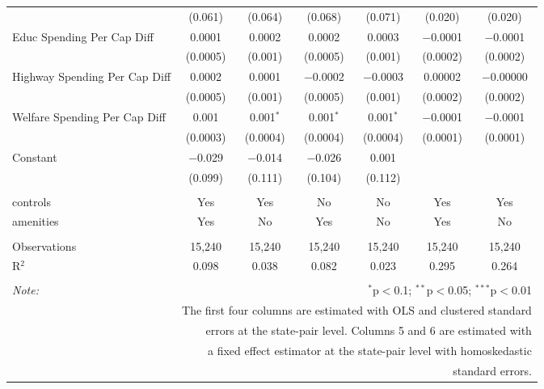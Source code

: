 \begin{table}[!htbp]
\begin{tabular}{@{\extracolsep{5pt}}lcccccc}
  & (0.061) & (0.064) & (0.068) & (0.071) & (0.020) & (0.020) \\ 
  Educ Spending Per Cap Diff & 0.0001 & 0.0002 & 0.0002 & 0.0003 & $-$0.0001 & $-$0.0001 \\ 
  & (0.0005) & (0.001) & (0.0005) & (0.001) & (0.0002) & (0.0002) \\ 
  Highway Spending Per Cap Diff & 0.0002 & 0.0001 & $-$0.0002 & $-$0.0003 & 0.00002 & $-$0.00000 \\ 
  & (0.0005) & (0.001) & (0.0005) & (0.001) & (0.0002) & (0.0002) \\ 
  Welfare Spending Per Cap Diff & 0.001 & 0.001$^{*}$ & 0.001$^{*}$ & 0.001$^{*}$ & $-$0.0001 & $-$0.0001 \\ 
  & (0.0003) & (0.0004) & (0.0004) & (0.0004) & (0.0001) & (0.0001) \\ 
  Constant & $-$0.029 & $-$0.014 & $-$0.026 & 0.001 &  &  \\ 
  & (0.099) & (0.111) & (0.104) & (0.112) &  &  \\ 
 \hline \\[-1.8ex] 
controls & Yes & Yes & No & No & Yes & Yes \\ 
amenities & Yes & No & Yes & No & Yes & No \\ 
\hline \\[-1.8ex] 
Observations & 15,240 & 15,240 & 15,240 & 15,240 & 15,240 & 15,240 \\ 
R$^{2}$ & 0.098 & 0.038 & 0.082 & 0.023 & 0.295 & 0.264 \\ 
\hline 
\hline \\[-1.8ex] 
\textit{Note:}  & \multicolumn{6}{r}{$^{*}$p$<$0.1; $^{**}$p$<$0.05; $^{***}$p$<$0.01} \\ 
 & \multicolumn{6}{r}{The first four columns are estimated with OLS and clustered standard} \\ 
 & \multicolumn{6}{r}{ errors at the state-pair level. Columns 5 and 6 are estimated with} \\ 
 & \multicolumn{6}{r}{a fixed effect estimator at the state-pair level with homoskedastic} \\ 
 & \multicolumn{6}{r}{standard errors.} \\ 
\end{tabular} 
\end{table} 
